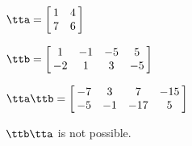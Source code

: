 {$\tta = \left[\hskip -3pt \begin{array}{cc} 1&4\\  7&6\end {array} \hskip -3pt
 \right] $ 

$\ttb =  \left[\hskip -3pt \begin{array}{cccc} 1&-1&-5&5\\  -2&1&3&-5
\end{array}\hskip -3pt \right]   $}
{$\tta\ttb = \left[\hskip -3pt \begin{array}{cccc} -7&3&7&-15\\  -5&-1&-17&5
\end{array}\hskip -3pt \right] $

$\ttb\tta$ is not possible.}

 

 

 



  

 

